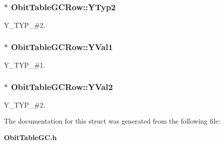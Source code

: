 \subsubsection{$\ast$ {\bf Obit\-Table\-GCRow::YTyp2}}\label{structObitTableGCRow_o20}


Y\_\-TYP\_\-\#2. 

\subsubsection{$\ast$ {\bf Obit\-Table\-GCRow::YVal1}}\label{structObitTableGCRow_o14}


Y\_\-TYP\_\-\#1. 

\subsubsection{$\ast$ {\bf Obit\-Table\-GCRow::YVal2}}\label{structObitTableGCRow_o22}


Y\_\-TYP\_\-\#2. 



The documentation for this struct was generated from the following file:\begin{CompactItemize}
\item 
{\bf Obit\-Table\-GC.h}\end{CompactItemize}
